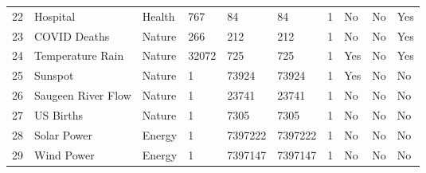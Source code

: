 \begin{tabular}{llllllllll}
22 & Hospital & Health & 767 & 84 & 84 & 1 & No & No & Yes \\
23 & COVID Deaths & Nature & 266 & 212 & 212 & 1 & No & No & Yes \\
24 & Temperature Rain & Nature & 32072 & 725 & 725 & 1 & Yes & No & Yes \\
25 & Sunspot & Nature & 1 & 73924 & 73924 & 1 & Yes & No & No \\
26 & Saugeen River Flow & Nature & 1 & 23741 & 23741 & 1 & No & No & No \\
27 & US Births & Nature & 1 & 7305 & 7305 & 1 & No & No & No \\
28 & Solar Power & Energy & 1 & 7397222 & 7397222 & 1 & No & No & No \\
29 & Wind Power & Energy & 1 & 7397147 & 7397147 & 1 & No & No & No \\
\bottomrule
\end{tabular}
